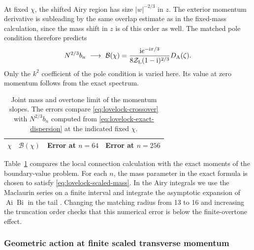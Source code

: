At fixed \(\chi\), the shifted Airy region has size
\(|w|^{-2/3}\) in \(z\). The exterior momentum derivative
is subleading by the same overlap estimate as in the
fixed-mass calculation, since the mass shift in \(z\) is
of this order as well. The matched pole condition
therefore predicts
\begin{equation}
 N^{2/3} b_n\ \longrightarrow\
 \mathcal B(\chi)=
 \frac{\mathrm{i} e^{-\mathrm{i}\pi/3}}{8\mathcal Z_{\rm L}(1-\mathrm{i})^{2/3}}
 D_{\rm A}(\zeta).
 \label{eq:lovelock-crossover}
\end{equation}
Only the \(k^2\) coefficient of the pole condition is varied
here. Its value at zero momentum follows from the exact spectrum.

\begin{table}[t]
 \centering\small
 \begin{tabular}{cccc}
 \hline
 \(\chi\) & \(\mathcal B(\chi)\) & Error at \(n=64\) & Error at \(n=256\) \\
 \hline
 
 \end{tabular}
 \caption{Joint mass and overtone limit of the momentum slopes.
 The errors compare \eqref{eq:lovelock-crossover} with
 \(N^{2/3}b_n\) computed from \eqref{eq:lovelock-exact-dispersion}
 at the indicated fixed \(\chi\).}
 \label{tab:lovelock-crossover}
\end{table}

Table~\ref{tab:lovelock-crossover} compares the local connection
calculation with the exact moments of the boundary-value problem.
For each \(n\), the mass parameter in the exact formula is chosen
to satisfy \eqref{eq:lovelock-scaled-mass}. In the Airy integrals
we use the Maclaurin series on a finite interval and integrate
the asymptotic expansion of \(\operatorname{Ai}\operatorname{Bi}\)
in the tail \cite{NIST:DLMF}. Changing the matching radius
from 13 to 16 and increasing the truncation order checks that
this numerical error is below the finite-overtone effect.

\subsubsection{Geometric action at finite scaled transverse momentum}

